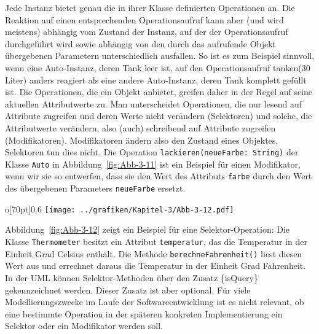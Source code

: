 Jede Instanz bietet genau die in ihrer Klasse definierten Operationen an. Die Reaktion auf einen entsprechenden Operationsaufruf kann aber (und wird meistens) abhängig vom Zustand der Instanz, auf der der Operationsaufruf durchgeführt wird sowie abhängig von den durch das aufrufende Objekt übergebenen Parametern unterschiedlich ausfallen. 
So ist es zum Beispiel sinnvoll, wenn eine Auto-Instanz, deren Tank leer ist, auf den Operationsaufruf tanken(30 Liter) anders reagiert als eine andere Auto-Instanz, deren Tank komplett gefüllt ist. Die Operationen, die ein Objekt anbietet, greifen daher in der Regel auf seine aktuellen Attributwerte zu. Man unterscheidet Operationen, die nur lesend auf Attribute zugreifen und deren Werte nicht verändern (Selektoren) und solche, die Attributwerte verändern, also (auch) schreibend auf Attribute zugreifen (Modifikatoren). Modifikatoren ändern also den Zustand eines Objektes, Selektoren tun dies nicht. Die Operation \texttt{lackieren(neueFarbe: String)} der Klasse \texttt{Auto} in Abbildung~\ref{fig:Abb-3-11} ist ein Beispiel für einen Modifikator, wenn wir sie so entwerfen, dass sie den Wert des Attributs \texttt{farbe} durch den Wert des übergebenen Parameters \texttt{neueFarbe} ersetzt. 
\begin{wrapfigure}{o}[70pt]{0.6\textwidth}
	\centering 
	\texttt{[image: ../grafiken/Kapitel-3/Abb-3-12.pdf]}
	\caption{Eine Klasse \texttt{Thermometer} mit Attribut und Selektor-Operation}
	\label{fig:Abb-3-12}
	\vspace{-6pt}
\end{wrapfigure}
Abbildung~\ref{fig:Abb-3-12} zeigt ein Beispiel für eine Selektor-Operation: Die Klasse \texttt{Thermometer} besitzt ein Attribut \texttt{temperatur}, das die Temperatur in der Einheit Grad Celsius enthält. Die Methode \texttt{berechneFahrenheit()} liest diesen Wert aus und errechnet daraus die Temperatur in der Einheit Grad Fahrenheit. In der UML können Selektor-Methoden über den Zusatz \{isQuery\} gekennzeichnet werden. Dieser Zusatz ist aber optional. Für viele Modellierungszwecke im Laufe der Softwareentwicklung ist es nicht relevant, ob eine bestimmte Operation in der späteren konkreten Implementierung ein Selektor oder ein Modifikator werden soll.

